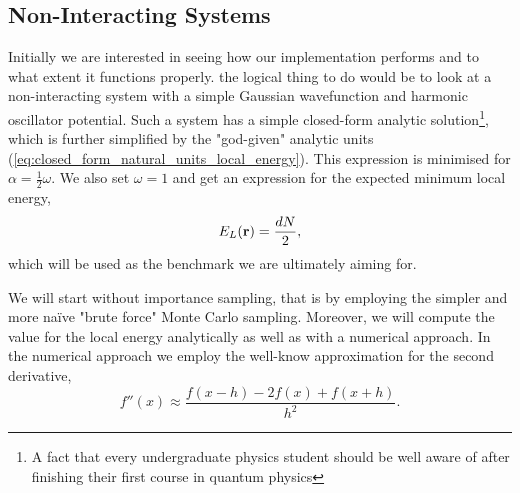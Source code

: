 \documentclass[
    a4paper, aps, twocolumn, floatfix, superscriptaddress, nofootinbib]{revtex4-1}
\newcommand{\1}{\mathds{1}}
\begin{document}
    \subsection{Non-Interacting Systems}
        Initially we are interested in seeing how our implementation performs
        and to what extent it functions properly.  the logical thing to do would
        be to look at a non-interacting system with a simple Gaussian
        wavefunction and harmonic oscillator potential. Such a system has a
        simple closed-form analytic solution\footnote{A fact that every
        undergraduate physics student should be well aware of after finishing
        their first course in quantum physics}, which is further simplified by
        the "god-given" analytic units
        (\autoref{eq:closed_form_natural_units_local_energy}). This expression
        is minimised for $\alpha = \frac{1}{2}\omega$. We also set $\omega = 1$
        and get an expression for the expected minimum local energy,
        \begin{equation}
            E_L(\vb{r}) = \frac{dN}{2},
        \end{equation}
        which will be used as the benchmark we are ultimately aiming for.

        We will start without importance sampling, that is by employing the
        simpler and more naïve "brute force" Monte Carlo sampling. Moreover, we
        will compute the value for the local energy analytically as well as with
        a numerical approach.  In the numerical approach we employ the well-know
        approximation for the second derivative,
        \begin{equation}
                f''(x) \approx \frac{f(x-h) - 2f(x) + f(x+h)}{h^2}.
        \end{equation}
\end{document}
